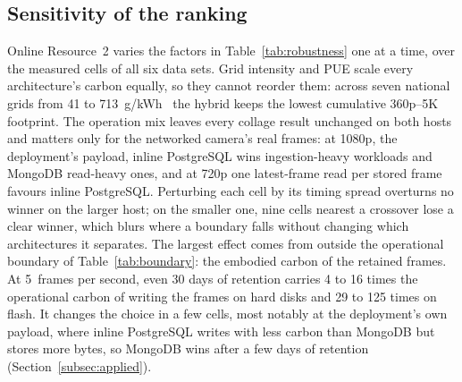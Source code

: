 \documentclass[pdflatex,sn-basic]{sn-jnl}%
\begin{document}
\subsection{{\color{markup}Sensitivity of the ranking}}\label{subsec:grid}
{\color{markup}Online Resource~2 varies the factors in Table~\ref{tab:robustness} one at a time, over the measured cells of all six data sets.} {\color{markup}Grid intensity and PUE scale every architecture's carbon equally, so they cannot reorder them: across seven national grids from 41 to 713~g/kWh~\citep{owid_carbon_intensity} the hybrid keeps the lowest cumulative 360p--5K footprint.} {\color{markup}The operation mix leaves every collage result unchanged on both hosts and matters only for the networked camera's real frames: at 1080p, the deployment's payload, inline PostgreSQL wins ingestion-heavy workloads and MongoDB read-heavy ones, and at 720p one latest-frame read per stored frame favours inline PostgreSQL.} {\color{markup}Perturbing each cell by its timing spread overturns no winner on the larger host; on the smaller one, nine cells nearest a crossover lose a clear winner, which blurs where a boundary falls without changing which architectures it separates.} {\color{markup}The largest effect comes from outside the operational boundary of Table~\ref{tab:boundary}: the embodied carbon of the retained frames.} {\color{markup}At 5~frames per second, even 30 days of retention carries 4 to 16 times the operational carbon of writing the frames on hard disks and 29 to 125 times on flash.} {\color{markup}It changes the choice in a few cells, most notably at the deployment's own payload, where inline PostgreSQL writes with less carbon than MongoDB but stores more bytes, so MongoDB wins after a few days of retention (Section~\ref{subsec:applied}).}
\end{document}
